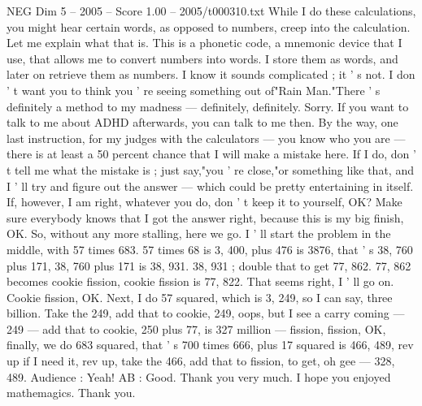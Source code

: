 \begin{textsample}{NEG Dim 5 – 2005 – Score 1.00 – 2005/t000310.txt}
While I do these calculations, you might hear certain words, as opposed to numbers, creep into the calculation.
Let me explain what that is.
This is a phonetic code, a mnemonic device that I use, that allows me to convert numbers into words.
I store them as words, and later on retrieve them as numbers.
I know it sounds complicated ; it ' s not.
I don ' t want you to think you ' re seeing something out of"Rain Man."There ' s definitely a method to my madness — definitely, definitely.
Sorry.
If you want to talk to me about ADHD afterwards, you can talk to me then.
By the way, one last instruction, for my judges with the calculators — you know who you are — there is at least a 50 percent chance that I will make a mistake here.
If I do, don ' t tell me what the mistake is ; just say,"you ' re close,"or something like that, and I ' ll try and figure out the answer — which could be pretty entertaining in itself.
If, however, I am right, whatever you do, don ' t keep it to yourself, OK?
Make sure everybody knows that I got the answer right, because this is my big finish, OK.
So, without any more stalling, here we go.
I ' ll start the problem in the middle, with 57 times 683. 57 times 68 is 3, 400, plus 476 is 3876, that ' s 38, 760 plus 171, 38, 760 plus 171 is 38, 931. 38, 931 ; double that to get 77, 862. 77, 862 becomes cookie fission, cookie fission is 77, 822.
That seems right, I ' ll go on.
Cookie fission, OK.
Next, I do 57 squared, which is 3, 249, so I can say, three billion.
Take the 249, add that to cookie, 249, oops, but I see a carry coming — 249 — add that to cookie, 250 plus 77, is 327 million — fission, fission, OK, finally, we do 683 squared, that ' s 700 times 666, plus 17 squared is 466, 489, rev up if I need it, rev up, take the 466, add that to fission, to get, oh gee — 328, 489.
Audience : Yeah!
AB : Good.
Thank you very much.
I hope you enjoyed mathemagics.
Thank you.

\end{textsample}
